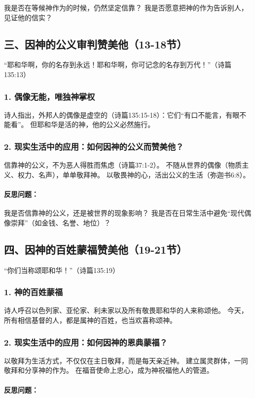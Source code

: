 \documentclass[a4paper, 12pt]{article}
\begin{document}
我是否在等候神作为的时候，仍然坚定信靠？
我是否愿意把神的作为告诉别人，见证他的信实？
\subsection*{三、因神的公义审判赞美他（13-18节）}
“耶和华啊，你的名存到永远！耶和华啊，你可记念的名存到万代！”（诗篇135:13）

\subsubsection*{1. 偶像无能，唯独神掌权}
诗人指出，外邦人的偶像是虚空的（诗篇135:15-18）：它们“有口不能言，有眼不能看”。
但耶和华是活的神，他的公义必然施行。
\subsubsection*{2. 现实生活中的应用：如何因神的公义而赞美他？}
信靠神的公义，不为恶人得胜而焦虑（诗篇37:1-2）。
不随从世界的偶像（物质主义、权力、名声），单单敬拜神。
以敬畏神的心，活出公义的生活（弥迦书6:8）。
\paragraph*{反思问题：}

我是否信靠神的公义，还是被世界的现象影响？
我是否在日常生活中避免“现代偶像崇拜”（如金钱、名誉、地位）？
\subsection*{四、因神的百姓蒙福赞美他（19-21节）}
“你们当称颂耶和华！”（诗篇135:19）

\subsubsection*{1. 神的百姓蒙福}
诗人呼召以色列家、亚伦家、利未家以及所有敬畏耶和华的人来称颂他。
今天，所有相信基督的人，都是属神的百姓，也当欢喜称颂神。
\subsubsection*{2. 现实生活中的应用：如何因神的恩典蒙福？}
以敬拜为生活方式，不仅仅在主日敬拜，而是每天亲近神。
建立属灵群体，一同敬拜和分享神的作为。
在福音使命上忠心，成为神祝福他人的管道。
\paragraph*{反思问题：}
\end{document}
